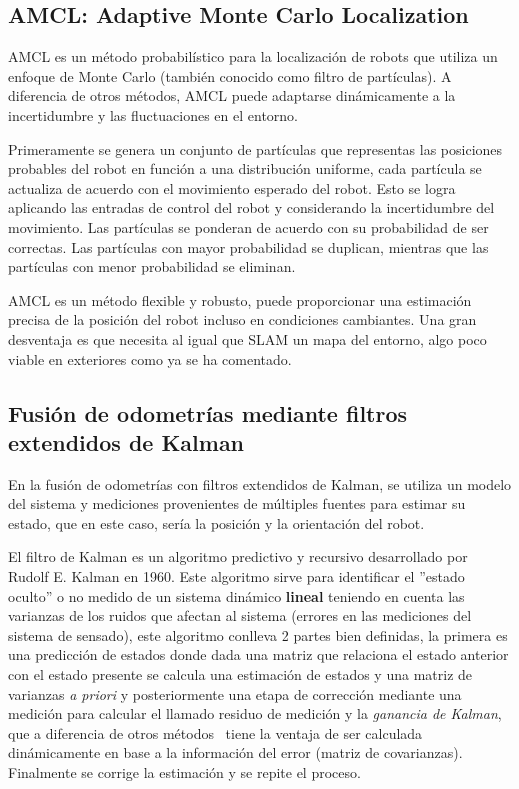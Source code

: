 \subsection{AMCL: Adaptive Monte Carlo Localization}

AMCL es un método probabilístico para la localización de robots que utiliza un enfoque de Monte Carlo (también conocido como filtro de 
partículas). A diferencia de otros métodos, AMCL puede adaptarse dinámicamente a la incertidumbre y las fluctuaciones en el entorno. 

Primeramente se genera un conjunto de partículas que representas las posiciones probables del robot en función a una distribución uniforme, 
cada partícula se actualiza de acuerdo con el movimiento esperado del robot. Esto se logra aplicando las entradas de control del robot y 
considerando la incertidumbre del movimiento. Las partículas se ponderan de acuerdo con su probabilidad de ser correctas. Las partículas 
con mayor probabilidad se duplican, mientras que las partículas con menor probabilidad se eliminan. 

AMCL es un método flexible y robusto, puede proporcionar una estimación precisa de la posición del robot incluso en condiciones cambiantes. 
Una gran desventaja es que necesita al igual que SLAM un mapa del entorno, algo poco viable en exteriores como ya se ha comentado.

\subsection{Fusión de odometrías mediante filtros extendidos de Kalman}

En la fusión de odometrías con filtros extendidos de Kalman, se utiliza un modelo del sistema y mediciones provenientes de múltiples fuentes para estimar su estado,
 que en este caso, sería la posición y la orientación del robot.

El filtro de Kalman es un algoritmo predictivo y recursivo desarrollado por Rudolf E. Kalman en 1960. Este algoritmo sirve para identificar el ''estado oculto'' o no medido de un sistema dinámico \textbf{lineal} teniendo en cuenta las varianzas de 
los ruidos que afectan al sistema (errores en las mediciones del sistema de sensado), este algoritmo conlleva 2 partes 
bien definidas, la primera es una predicción de estados donde dada una matriz que relaciona el estado anterior con el estado presente 
se calcula una estimación de estados y una matriz de varianzas \textit{a priori} y posteriormente una etapa de corrección mediante una 
medición para calcular el llamado residuo de medición y la \textit{ganancia de Kalman}, 
que a diferencia de otros métodos~\cite{wikiLuenberg} tiene la ventaja de ser calculada dinámicamente en base a la información del error (matriz de covarianzas). 
Finalmente se corrige la estimación y se repite el proceso.

